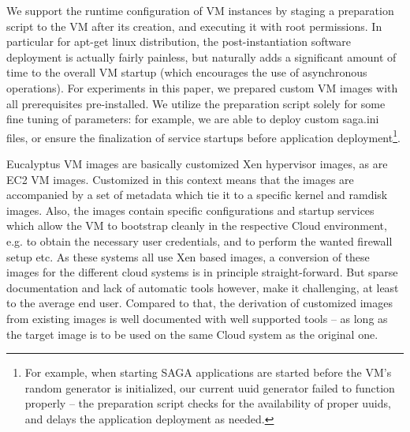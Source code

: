 \documentclass[conference,final]{IEEEtran}
\begin{document}
We support the runtime configuration of VM instances by staging a
preparation script to the VM after its creation, and executing it with
root permissions.  In particular for apt-get linux distribution, the
post-instantiation software deployment is actually fairly painless,
but naturally adds a significant amount of time to the overall VM
startup (which encourages the use of asynchronous operations).
For experiments in this paper, we prepared custom VM images with all
prerequisites pre-installed.  We utilize the preparation script solely
for some fine tuning of parameters: for example, we are able to deploy
custom saga.ini files, or ensure the finalization of service startups
before application deployment\footnote{For example, when starting SAGA
  applications are started before the VM's random generator is
  initialized, our current uuid generator failed to function properly
  -- the preparation script checks for the availability of proper
  uuids, and delays the application deployment as needed.}.

Eucalyptus VM images are basically customized Xen hypervisor images,
as are EC2 VM images.  Customized in this context means that the
images are accompanied by a set of metadata which tie it to a specific
kernel and ramdisk images.  Also, the images contain specific
configurations and startup services which allow the VM to bootstrap
cleanly in the respective Cloud environment, e.g. to obtain the
necessary user credentials, and to perform the wanted firewall setup
etc.  As these systems all use Xen based images, a conversion of these
images for the different cloud systems is in principle
straight-forward.  But sparse documentation and lack of automatic
tools however, make it challenging, at least to the average end
user. Compared to that, the derivation of customized images from
existing images is well documented with well supported tools -- as
long as the target image is to be used on the same Cloud system as the
original one.
\end{document}
